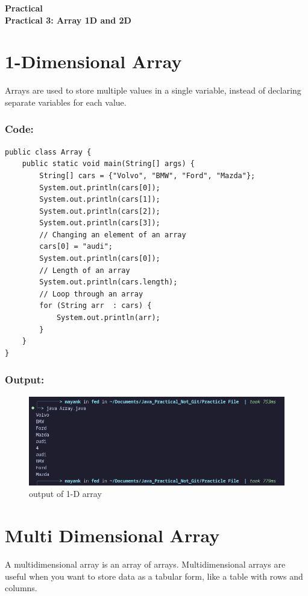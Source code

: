 \documentclass[a4paper,12pt]{article}
\newcounter{practicalno} %
\newcommand{\practicaltitle}[1]{
    \stepcounter{practicalno} %
    \newpage
    \begin{center}
        \vspace{1cm}
        \Large\textbf{Practical \thepracticalno} \\
        \vspace{0.5cm}
        \Large\textbf{#1} %
        \normalsize\vspace{1cm}
    \end{center}
}
\begin{document}
\practicaltitle{Practical 3: Array 1D and 2D}

\section{1-Dimensional Array}
Arrays are used to store multiple values in a single variable, instead of declaring separate variables for each value.
\subsubsection{Code: }
\begin{lstlisting}
public class Array {
    public static void main(String[] args) {
        String[] cars = {"Volvo", "BMW", "Ford", "Mazda"};
        System.out.println(cars[0]); 
        System.out.println(cars[1]); 
        System.out.println(cars[2]); 
        System.out.println(cars[3]); 
        // Changing an element of an array
        cars[0] = "audi";
        System.out.println(cars[0]); 
        // Length of an array
        System.out.println(cars.length);
        // Loop through an array
        for (String arr  : cars) {
            System.out.println(arr);
        }
    }
}  
\end{lstlisting}
\subsubsection{Output: }
\begin{figure}[H]
    \centering
    \includegraphics[width=0.9\linewidth]{images/output2.png}
    \caption{output of 1-D array}
    \label{fig:sample_image}
\end{figure}

\section{Multi Dimensional Array}
A multidimensional array is an array of arrays. Multidimensional arrays are useful when you want to store data as a tabular form, like a table with rows and columns.
\end{document}
